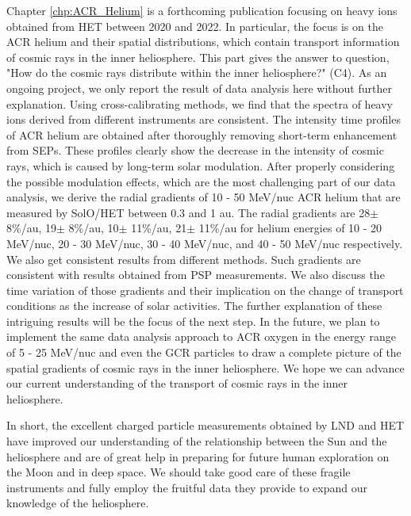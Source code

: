 Chapter \ref{chp:ACR_Helium} is a forthcoming publication focusing on heavy ions obtained from \ac{HET} between 2020 and 2022. In particular, the focus is on the \ac{ACR} helium and their spatial distributions, which contain transport information of cosmic rays in the inner heliosphere. This part gives the answer to question, "How do the cosmic rays distribute within the inner heliosphere?" (C4). As an ongoing project, we only report the result of data analysis here without further explanation. Using cross-calibrating methods, we find that the spectra of heavy ions derived from different instruments are consistent. The intensity time profiles of \ac{ACR} helium are obtained after thoroughly removing short-term enhancement from \acp{SEP}. These profiles clearly show the decrease in the intensity of cosmic rays, which is caused by long-term solar modulation.
After properly considering the possible modulation effects, which are the most challenging part of our data analysis, we derive the radial gradients of 10 - 50 MeV/nuc \ac{ACR} helium that are measured by \ac{SolO}/\ac{HET} between 0.3 and 1 au. The radial gradients are 28$\pm$ 8\%/au, 19$\pm$ 8\%/au, 10$\pm$ 11\%/au, 21$\pm$ 11\%/au for helium energies of 10 - 20 MeV/nuc, 20 - 30 MeV/nuc, 30 - 40 MeV/nuc, and 40 - 50 MeV/nuc respectively. We also get consistent results from different methods.
Such gradients are consistent with results obtained from \ac{PSP} measurements. We also discuss the time variation of those gradients and their implication on the change of transport conditions as the increase of solar activities. The further explanation of these intriguing results will be the focus of the next step. In the future,  we plan to implement the same data analysis approach to \ac{ACR} oxygen in the energy range of 5 - 25 MeV/nuc and even the \ac{GCR} particles to draw a complete picture of the spatial gradients of cosmic rays in the inner heliosphere. 
We hope we can advance our current understanding of the transport of cosmic rays in the inner heliosphere.


In short, the excellent charged particle measurements obtained by \ac{LND} and \ac{HET} have improved our understanding of the relationship between the Sun and the heliosphere and are of great help in preparing for future human exploration on the Moon and in deep space. We should take good care of these fragile instruments and fully employ the fruitful data they provide to expand our knowledge of the heliosphere.



